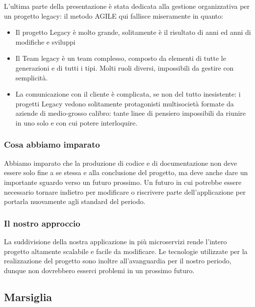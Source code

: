 \documentclass{report}
\begin{document}
L'ultima parte della presentazione è stata dedicata alla gestione organizzativa per un progetto legacy: il metodo AGILE qui fallisce miseramente in quanto:
\begin{itemize}
	\item Il progetto Legacy è molto grande, solitamente è il risultato di anni ed anni di modifiche e sviluppi
	\item Il Team legacy è un team complesso, composto da elementi di tutte le generazioni e di tutti i tipi. Molti ruoli diversi, impossibili da gestire con semplicità.
	\item La comunicazione con il cliente è complicata, se non del tutto inesistente: i progetti Legacy vedono solitamente protagonisti multisocietà formate da aziende di medio-grosso calibro: tante linee di pensiero impossibili da riunire in uno solo e con cui potere interloquire.
\end{itemize}

\subsubsection*{Cosa abbiamo imparato}
Abbiamo imparato che la produzione di codice e di documentazione non deve essere solo fine a se stessa e alla conclusione del progetto, ma deve anche dare un importante sguardo verso un futuro prossimo. Un futuro in cui potrebbe essere necessario tornare indietro per modificare o riscrivere parte dell'applicazione per portarla nuovamente agli standard del periodo.

\subsubsection*{Il nostro approccio}
La suddivisione della nostra applicazione in più microservizi rende l'intero progetto altamente scalabile e facile da modificare. Le tecnologie utilizzate per la realizzazione del progetto sono inoltre all'avanguardia per il nostro periodo, dunque non dovrebbero esserci problemi in un prossimo futuro.


\subsection{Marsiglia}
\end{document}
